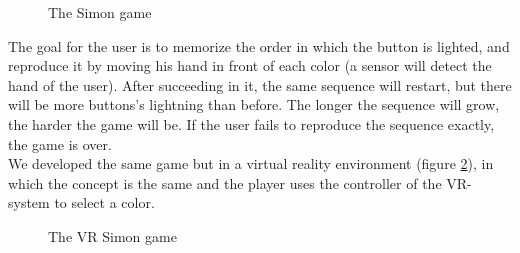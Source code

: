 \documentclass[12pt, openany, twocolumn]{article}
\begin{document}
    \begin{figure}[H]
        \centering
        \setlength{\fboxsep}{0pt}
        \caption{The Simon game}
        \label{figure1}
    \end{figure}

    The goal for the user is to memorize the order in which the button is lighted, and reproduce it by moving his hand in front of each color (a sensor will detect the hand of the user).
    After succeeding in it, the same sequence will restart, but there will be more buttons's lightning than before.
    The longer the sequence will grow, the harder the game will be.
    If the user fails to reproduce the sequence exactly, the game is over.
    \\

    We developed the same game but in a virtual reality environment (figure \ref{figure2}), in which the concept is the same and the player uses the controller of the VR-system to select a color.
    \begin{figure}[H]
        \centering
        \setlength{\fboxsep}{0pt}
        \caption{The VR Simon game}
        \label{figure2}   
    \end{figure}
\end{document}
